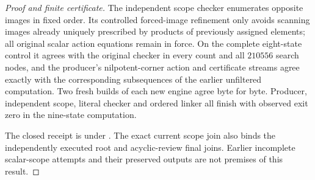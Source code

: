 \begin{proof}[Proof and finite certificate]
The independent scope checker enumerates opposite images in fixed
order.  Its controlled forced-image refinement only avoids scanning
images already uniquely prescribed by products of previously assigned
elements; all original scalar action equations remain in force.
On the complete eight-state control it agrees with the original
checker in every count and all $210556$ search nodes, and the producer's
nilpotent-corner action and certificate streams agree exactly with the
corresponding subsequences of the earlier unfiltered computation.
Two fresh builds of each new engine agree byte for byte.  Producer,
independent scope, literal checker and ordered linker all finish with
observed exit zero in the nine-state computation.

The closed receipt is
under .
The exact current scope join also binds the independently executed
root and acyclic-review final joins.  Earlier incomplete scalar-scope
attempts and their preserved outputs are not premises of this result.
\end{proof}
